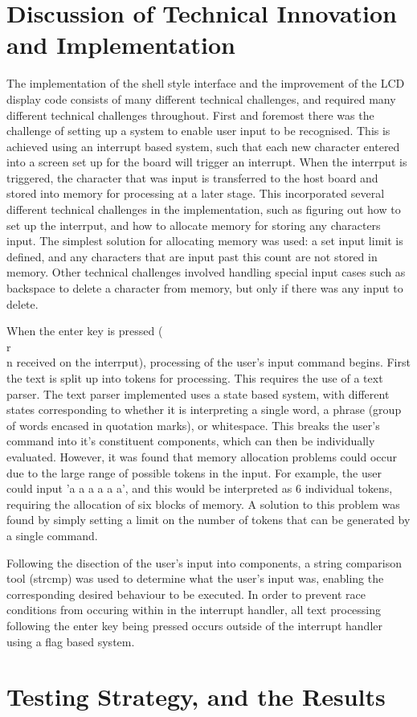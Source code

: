 \section{Discussion of Technical Innovation and Implementation}

The implementation of the shell style interface and the improvement of the LCD 
display code consists of many different technical challenges, and required many 
different technical challenges throughout. First and foremost there was the 
challenge of setting up a system to enable user input to be recognised. This is 
achieved using an interrupt based system, such that each new character entered into 
a screen set up for the board will trigger an interrupt. When the interrput is 
triggered, the character that was input is transferred to the host board and stored into 
memory for processing at a later stage. This incorporated several different technical 
challenges in the implementation, such as figuring out how to set up the interrput, and 
how to allocate memory for storing any characters input. The simplest solution for 
allocating memory was used: a set input limit is defined, and any characters that are 
input past this count are not stored in memory. Other technical challenges involved handling 
special input cases such as backspace to delete a character from memory, but only if there 
was any input to delete. 
\par\bigskip\noindent
When the enter key is pressed (\\r\\n received on the interrput), processing of the user's 
input command begins. 
First the text is split up into tokens for processing. This 
requires the use of a text parser. The text parser implemented uses a state based system,
with different states corresponding to whether it is interpreting a single word, a phrase 
(group of words encased in quotation marks), or whitespace. This breaks the user's 
command into it's constituent components, which can then be individually evaluated. 
However, it was found that memory allocation problems could occur due to the large range of 
possible tokens in the input. For example, the user could input 'a a a a a a', and this 
would be interpreted as 6 individual tokens, requiring the allocation of six blocks of 
memory. A solution to this problem was found by simply setting a limit on the number 
of tokens that can be generated by a single command. 
\par\bigskip\noindent
Following the disection of the user's input into components, a string comparison tool (strcmp)
was used to determine what the user's input was, enabling the corresponding desired 
behaviour to be executed. In order to prevent race conditions from occuring within in the 
interrupt handler, all text processing following the enter key being pressed occurs 
outside of the interrupt handler using a flag based system. 


\section{Testing Strategy, and the Results}
